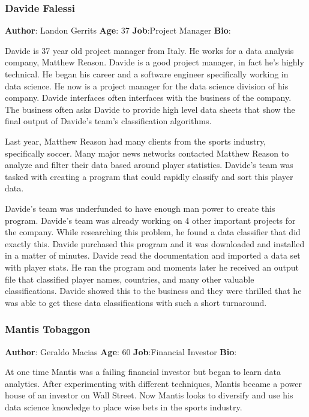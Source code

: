 \documentclass[12pt,oneside,letterpaper]{article}
\begin{document}
\subsubsection{Davide Falessi}
\textbf{Author}: Landon Gerrits\newline
\textbf{Age}: 37\newline
\textbf{Job}:Project Manager\newline
\textbf{Bio}:\newline
\par Davide is 37 year old project manager from Italy. He works for a data analysis company, Matthew Reason. Davide is a good project manager, in fact he's highly technical. He began his career and a software engineer specifically working in data science. He now is a project manager for the data science division of his company. Davide interfaces often interfaces with the business of the company. The business often asks Davide to provide high level data sheets that show the final output of Davide's team's classification algorithms.
\par Last year, Matthew Reason had many clients from the sports industry, specifically soccer. Many major news networks contacted Matthew Reason to analyze and filter their data based around player statistics. Davide's team was tasked with creating a program that could rapidly classify and sort this player data.
\par Davide's team was underfunded to have enough man power to create this program. Davide's team was already working on 4 other important projects for the company. While researching this problem, he found a data classifier that did exactly this. Davide purchased this program and it was downloaded and installed in a matter of minutes. Davide read the documentation and imported a data set with player stats. He ran the program and moments later he received an output file that classified player names, countries, and many other valuable classifications. Davide showed this to the business and they were thrilled that he was able to get these data classifications with such a short turnaround.


\subsubsection{Mantis Tobaggon}
\textbf{Author}: Geraldo Macias\newline
\textbf{Age}: 60\newline
\textbf{Job}:Financial Investor\newline
\textbf{Bio}:\newline
\par At one time Mantis was a failing financial investor but began to learn data analytics. After experimenting with different techniques, Mantis became a power house of an investor on Wall Street. Now Mantis looks to diversify and use his data science knowledge to place wise bets in the sports industry.
\end{document}
